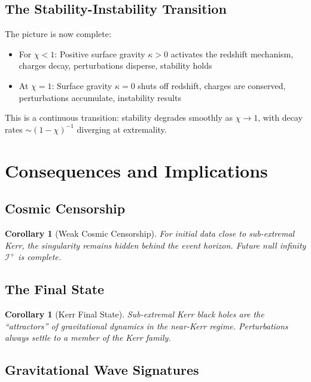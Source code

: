 \documentclass[12pt,a4paper]{article}
\newtheorem{corollary}[theorem]{Corollary}
\begin{document}
\subsection{The Stability-Instability Transition}

The picture is now complete:
\begin{itemize}
    \item For $\chi < 1$: Positive surface gravity $\kappa > 0$ activates the redshift mechanism, charges decay, perturbations disperse, stability holds
    \item At $\chi = 1$: Surface gravity $\kappa = 0$ shuts off redshift, charges are conserved, perturbations accumulate, instability results
\end{itemize}

This is a continuous transition: stability degrades smoothly as $\chi \to 1$, with decay rates $\sim (1-\chi)^{-1}$ diverging at extremality.

\section{Consequences and Implications}

\subsection{Cosmic Censorship}

\begin{corollary}[Weak Cosmic Censorship]
For initial data close to sub-extremal Kerr, the singularity remains hidden behind the event horizon. Future null infinity $\mathscr{I}^+$ is complete.
\end{corollary}

\subsection{The Final State}

\begin{corollary}[Kerr Final State]
Sub-extremal Kerr black holes are the ``attractors'' of gravitational dynamics in the near-Kerr regime. Perturbations always settle to a member of the Kerr family.
\end{corollary}

\subsection{Gravitational Wave Signatures}
\end{document}
